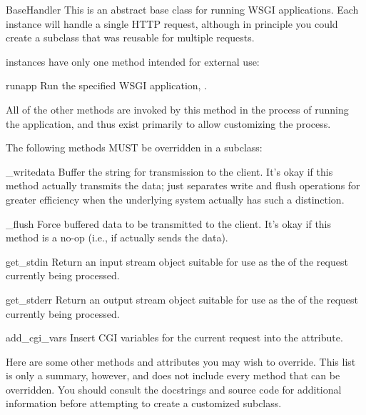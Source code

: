 \begin{classdesc}{BaseHandler}{}
This is an abstract base class for running WSGI applications.  Each
instance will handle a single HTTP request, although in principle you
could create a subclass that was reusable for multiple requests.

 instances have only one method intended for external
use:

\begin{methoddesc}{run}{app}
Run the specified WSGI application, .
\end{methoddesc}

All of the other  methods are invoked by this method
in the process of running the application, and thus exist primarily to
allow customizing the process.

The following methods MUST be overridden in a subclass:

\begin{methoddesc}{_write}{data}
Buffer the string  for transmission to the client.  It's okay
if this method actually transmits the data; 
just separates write and flush operations for greater efficiency
when the underlying system actually has such a distinction.
\end{methoddesc}

\begin{methoddesc}{_flush}{}
Force buffered data to be transmitted to the client.  It's okay if this
method is a no-op (i.e., if  actually sends the data).
\end{methoddesc}

\begin{methoddesc}{get_stdin}{}
Return an input stream object suitable for use as the 
of the request currently being processed.
\end{methoddesc}

\begin{methoddesc}{get_stderr}{}
Return an output stream object suitable for use as the
 of the request currently being processed.
\end{methoddesc}

\begin{methoddesc}{add_cgi_vars}{}
Insert CGI variables for the current request into the 
attribute.
\end{methoddesc}

Here are some other methods and attributes you may wish to override.
This list is only a summary, however, and does not include every method
that can be overridden.  You should consult the docstrings and source
code for additional information before attempting to create a customized
 subclass.

















\end{classdesc}
